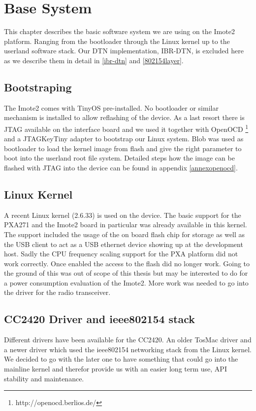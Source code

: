 \chapter{Base System}
This chapter describes the basic software system we are using on the Imote2
platform. Ranging from the bootloader through the Linux kernel up to the
userland software stack. Our DTN implementation, IBR-DTN, is excluded here as we
describe them in detail in \ref{ibr-dtn} and \ref{802154layer}.

\section{Bootstraping}
The Imote2 comes with TinyOS pre-installed. No bootloader or similar mechanism
is installed to allow reflashing of the device. As a last resort there is JTAG
available on the interface board and we used it together with OpenOCD
\footnote{http://openocd.berlios.de/} and a
JTAGKeyTiny adapter to bootstrap our Linux system. Blob was used as bootloader to
load the kernel image from flash and give the right parameter to boot into the
userland root file system. Detailed steps how the image can be flashed with JTAG
into the device can be found in appendix \ref{annexopenocd}.

\section{Linux Kernel}
A recent Linux kernel (2.6.33) is used on the device. The basic support for the
PXA271 and the Imote2 board in particular was already available in this kernel.
The support included the usage of the on board flash chip for storage as well as
the USB client to act as a USB ethernet device showing up at the development host.
Sadly the CPU frequency scaling support for the PXA platform did not work
correctly. Once enabled the access to the flash did no longer work. Going to the
ground of this was out of scope of this thesis but may be interested to do for a
power consumption evaluation of the Imote2. More work was needed to go into the
driver for the radio transceiver.

\section{CC2420 Driver and ieee802154 stack}
Different drivers have been available for the CC2420. An older TosMac driver and
a newer driver which used the ieee802154 networking stack from the Linux kernel.
We decided to go with the later one to have something that could go into the
mainline kernel and therefor provide us with an easier long term use, API
stability and maintenance.

